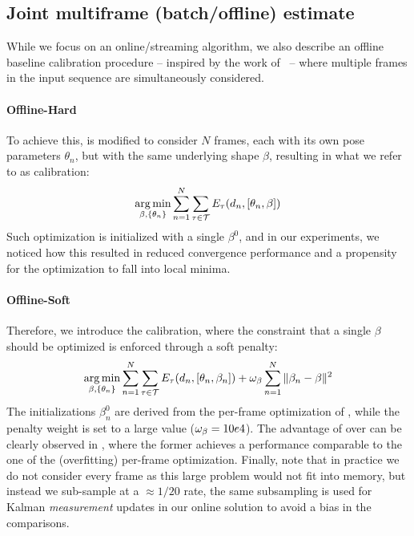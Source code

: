 

\subsection{Joint multiframe (batch/offline) estimate}
\label{sec:batch}
\label{sec:offline}
While we focus on an online/streaming algorithm, we also describe an offline baseline calibration procedure -- inspired by the work of~\cite{taylor2014user} -- where multiple frames in the input sequence are simultaneously considered. 

\paragraph{Offline-Hard}
To achieve this,  is modified to consider $N$ frames, each with its own pose parameters $\theta_n$, but with the same underlying shape $\beta$, resulting in what we refer to as \emph{\OfflineHard{}} calibration:
% 
\begin{equation}
\operatorname*{arg\,min}_{\beta, \{\theta_n\} } \sum_{n=1}^N \sum_{\tau \in \mathcal{T}} E_{\tau}(d_n, [\theta_n, \beta]) 
\label{eq:offlinehard}
\end{equation}
% 
Such optimization is initialized with a single $\beta^0$, and in our experiments, we noticed how this resulted in reduced convergence performance and a propensity for the optimization to fall into local minima. 

\newpage
\paragraph{Offline-Soft}
Therefore, we introduce the \emph{\OfflineSoft{}} calibration, where the constraint that a single $\beta$ should be optimized is enforced through a soft penalty:
% 
\begin{equation}
\operatorname*{arg\,min}_{\beta, \{\theta_n\} } \sum_{n=1}^N \sum_{\tau \in \mathcal{T}} E_{\tau}(d_n, [\theta_n, \beta_n]) + \omega_{\beta} \sum_{n=1}^N \| \beta_n - \beta \|^2
\label{eq:offlinesoft}
\end{equation}
%
The initializations $\beta_n^0$ are derived from the per-frame optimization of , while the penalty weight is set to a large value ($\small \omega_{\beta}=10e4$). The advantage of \OfflineSoft{} over \OfflineHard{} can be clearly observed in , where the former achieves a performance comparable to the one of the (overfitting) per-frame optimization. Finally, note that in practice we do not consider every frame as this large problem would not fit into memory, but instead we sub-sample at a $\approx 1/20$ rate, the same subsampling is used for Kalman \emph{measurement} updates in our online solution to avoid a bias in the comparisons.

